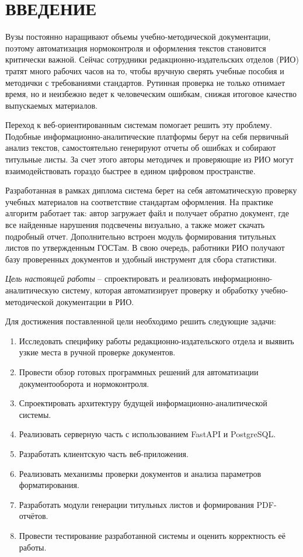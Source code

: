\section*{ВВЕДЕНИЕ}

Вузы постоянно наращивают объемы учебно-методической документации, поэтому автоматизация нормоконтроля и оформления текстов становится критически важной. Сейчас сотрудники редакционно-издательских отделов (РИО) тратят много рабочих часов на то, чтобы вручную сверять учебные пособия и методички с требованиями стандартов. Рутинная проверка не только отнимает время, но и неизбежно ведет к человеческим ошибкам, снижая итоговое качество выпускаемых материалов.

Переход к веб-ориентированным системам помогает решить эту проблему. Подобные информационно-аналитические платформы берут на себя первичный анализ текстов, самостоятельно генерируют отчеты об ошибках и собирают титульные листы. За счет этого авторы методичек и проверяющие из РИО могут взаимодействовать гораздо быстрее в едином цифровом пространстве.

Разработанная в рамках диплома система берет на себя автоматическую проверку учебных материалов на соответствие стандартам оформления. На практике алгоритм работает так: автор загружает файл и получает обратно документ, где все найденные нарушения подсвечены визуально, а также может скачать подробный отчет. Дополнительно встроен модуль формирования титульных листов по утвержденным ГОСТам. В свою очередь, работники РИО получают базу проверенных документов и удобный инструмент для сбора статистики.

\textit{Цель настоящей работы} – спроектировать и реализовать информационно-аналитическую систему, которая автоматизирует проверку и обработку учебно-методической документации в РИО.

Для достижения поставленной цели необходимо решить следующие задачи:
\begin{enumerate}
	\item Исследовать специфику работы редакционно-издательского отдела и выявить узкие места в ручной проверке документов.
	\item Провести обзор готовых программных решений для автоматизации документооборота и нормоконтроля.
	\item Спроектировать архитектуру будущей информационно-аналитической системы.
	\item Реализовать серверную часть с использованием FastAPI и PostgreSQL.
	\item Разработать клиентскую часть веб-приложения.
	\item Реализовать механизмы проверки документов и анализа параметров форматирования. 
	\item Разработать модули генерации титульных листов и формирования PDF-отчётов. 
	\item Провести тестирование разработанной системы и оценить корректность её работы.
\end{enumerate}

